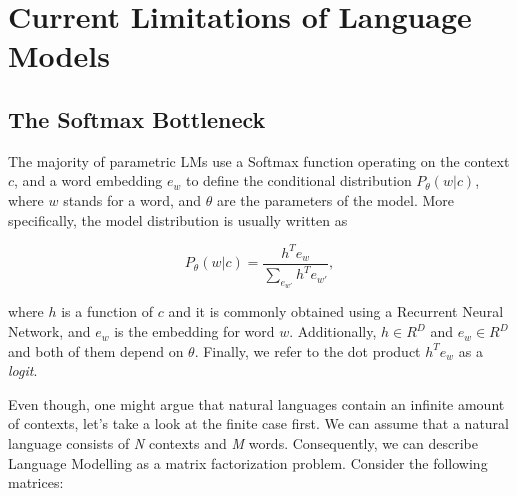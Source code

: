 \chapter{Current Limitations of Language Models}
\label{chapter:limitations}

\section{The Softmax Bottleneck}
\label{section:limitations:softmax_bottleneck}

The majority of parametric LMs use a Softmax function operating on the context $ c $, and a word embedding $ e_w $ to define the conditional distribution $ P_\theta(w|c) $, where $ w $ stands for a word, and $ \theta $ are the parameters of the model. More specifically, the model distribution is usually written as

\begin{displaymath}
    P_\theta(w | c) = \frac{h^Te_w}{\sum_{e_{w'}} h^Te_{w'}},
\end{displaymath}

where $ h $ is a function of $ c $ and it is commonly obtained using a Recurrent Neural Network, and $ e_w $ is the embedding for word $ w $. Additionally, $ h \in R^D $ and $ e_w \in R^D $ and both of them depend on $ \theta $. Finally, we refer to the dot product $ h^Te_w $ as a \emph{logit}.

Even though, one might argue that natural languages contain an infinite amount of contexts, let's take a look at the finite case first. We can assume that a natural language consists of \emph{N} contexts and \emph{M} words. Consequently, we can describe Language Modelling as a matrix factorization problem. Consider the following matrices:

